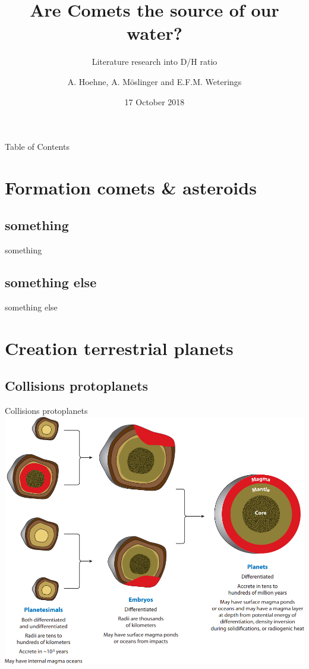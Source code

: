 \documentclass[11pt, aspectratio=169]{beamer}
\author{A. Hoehne, A. M\"{o}slinger and E.F.M. Weterings}
\title{Are Comets the source of our water?}
\subtitle{Literature research into D/H ratio}
\institute{Lule\aa \ University of Technology}
\date{17 October 2018}
\begin{document}
\begin{frame}
\titlepage
\end{frame}

\begin{frame}[t]{Table of Contents}
\tableofcontents[
    currentsection,
    sectionstyle=show/show,
    subsectionstyle=show/show,
  ]
\end{frame}



\section{Formation comets \& asteroids}
\subsection{something}
\begin{frame}[t]{something}

\end{frame}


\subsection{something else}
\begin{frame}[t]{something else}
\end{frame}


\section{Creation terrestrial planets}
\subsection{Collisions protoplanets}
\begin{frame}[t]{Collisions protoplanets}
	\centering
	\includegraphics[height=1\textheight]{figures/protoplanets.png}
\end{frame}
\end{document}
